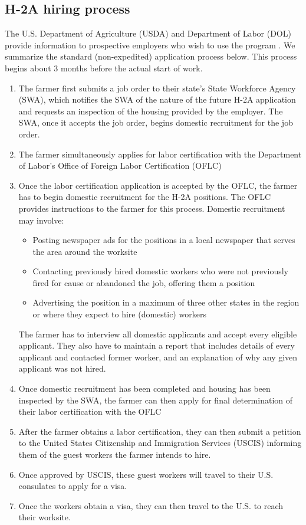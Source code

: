 \documentclass[14pt]{article}
\begin{document}
\subsection{H-2A hiring process}

The U.S. Department of Agriculture (USDA) and Department of Labor (DOL) provide information to prospective employers who wish to use the program \parencite{usda_h2a_checklist,dol_h2a_info}.  We summarize the standard (non-expedited) application process below.
This process begins about 3 months before the actual start of work.
\begin{enumerate}
	\item The farmer first submits a job order to their state's State Workforce Agency (SWA), which notifies the SWA of the nature of the future H-2A application and requests an inspection of the housing provided by the employer.
	      The SWA, once it accepts the job order, begins domestic recruitment for the job order.
	\item The farmer simultaneously applies for labor certification with the Department of Labor's Office of Foreign Labor Certification (OFLC)
	\item Once the labor certification application is accepted by the OFLC, the farmer has to begin domestic recruitment for the H-2A positions.
	      The OFLC provides instructions to the farmer for this process.
	      Domestic recruitment may involve:
	      \begin{itemize}
		      \item Posting newspaper ads for the positions in a local newspaper that serves the area around the worksite
		      \item Contacting previously hired domestic workers who were not previously fired for cause or abandoned the job, offering them a position
		      \item Advertising the position in a maximum of three other states in the region or where they expect to hire (domestic) workers
	      \end{itemize}
	      The farmer has to interview all domestic applicants and accept every eligible applicant.
	      They also have to maintain a report that includes details of every applicant and contacted former worker, and an explanation of why any given applicant was not hired.
	\item Once domestic recruitment has been completed and housing has been inspected by the SWA, the farmer can then apply for final determination of their labor certification with the OFLC
	\item After the farmer obtains a labor certification, they can then submit a petition to the United States Citizenship and Immigration Services (USCIS) informing them of the guest workers the farmer intends to hire.
	\item Once approved by USCIS, these guest workers will travel to their U.S. consulates to apply for a visa.
	\item Once the workers obtain a visa, they can then travel to the U.S. to reach their worksite.
\end{enumerate}
\end{document}
